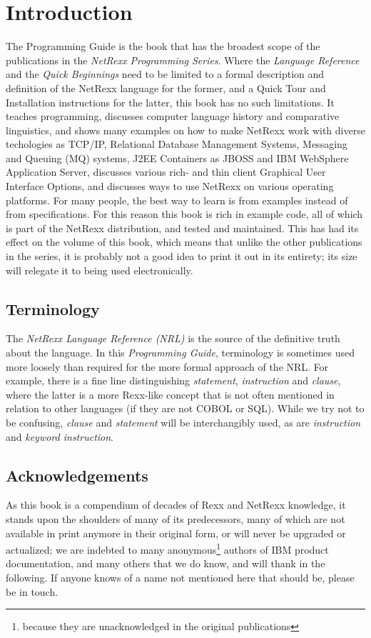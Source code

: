 \chapter{Introduction}
The Programming Guide is the book that has the broadest scope of the publications in the \emph{NetRexx Programming Series}. Where the \emph{Language Reference} and the \emph{Quick Beginnings} need to be limited to a formal description and definition of the NetRexx language for the former, and a Quick Tour and Installation instructions for the latter, this book has no such limitations. It teaches programming, discusses computer language history and comparative linguistics, and shows many examples on how to make NetRexx work with diverse techologies as TCP/IP, Relational Database Management Systems, Messaging and Queuing (MQ\textsuperscript{\texttrademark}) systems, J2EE Containers as JBOSS\textsuperscript{\texttrademark} and IBM WebSphere Application Server\textsuperscript{\texttrademark}, discusses various rich- and thin client Graphical User Interface Options, and discusses ways to use NetRexx on various operating platforms. For many people, the best way to learn is from examples instead of from specifications. For this reason this book is rich in example code, all of which is part of the NetRexx distribution, and tested and maintained. This has had its effect on the volume of this book, which means that unlike the other publications in the series, it is probably not a good idea to print it out in its entirety; its size will relegate it to being used electronically.
\section*{Terminology}
The \emph{NetRexx Language Reference (NRL)} is the source of the definitive truth about the language. In this \emph{Programming Guide}, terminology is sometimes used more loosely than required for the more formal approach of the NRL. For example, there is a fine line distinguishing \emph{statement}, \emph{instruction} and \emph{clause}, where the latter is a more Rexx-like concept that is not often mentioned in relation to other languages (if they are not COBOL or SQL). While we try not to be confusing, \emph{clause} and \emph{statement} will be interchangibly used, as are \emph{instruction} and \emph{keyword instruction}.
\section*{Acknowledgements}
As this book is a compendium of decades of Rexx and NetRexx knowledge, it stands upon the shoulders of many of its predecessors, many of which are not available in print anymore in their original form, or will never be upgraded or actualized; we are indebted to many anonymous\footnote{because they are unacknowledged in the original publications} authors of IBM product documentation, and many others that we do know, and will thank in the following. If anyone knows of a name not mentioned here that should be, please be in touch. 

